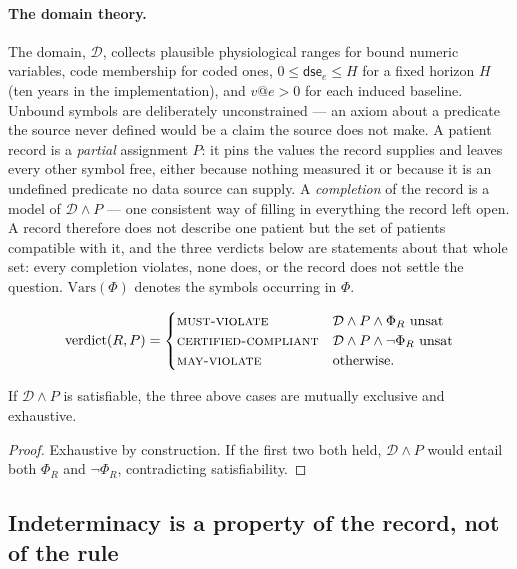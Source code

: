 \paragraph{The domain theory.}
The domain, $\mathcal{D}$, collects plausible physiological ranges for bound
numeric variables, code membership for coded ones, $0 \le \mathsf{dse}_e \le H$
for a fixed horizon $H$ (ten years in the implementation), and $v@e > 0$ for
each induced baseline. Unbound symbols are deliberately unconstrained --- an
axiom about a predicate the source never defined would be a claim the source
does not make. A patient record is a \emph{partial} assignment $P$: it pins the values the
record supplies and leaves every other symbol free, either because nothing
measured it or because it is an undefined predicate no data source can supply.
A \emph{completion} of the record is a model of $\mathcal{D} \wedge P$ --- one
consistent way of filling in everything the record left open. A record therefore
does not describe one patient but the set of patients compatible with it, and
the three verdicts below are statements about that whole set: every completion
violates, none does, or the record does not settle the question.
$\mathrm{Vars}(\Phi)$ denotes the symbols occurring in $\Phi$.

\[
\mathrm{verdict}(R,P) =
\begin{cases}
  \textsc{must-violate}       & \mathcal{D} \wedge P \wedge \Phi_R \ \text{unsat} \\
  \textsc{certified-compliant}& \mathcal{D} \wedge P \wedge \neg\Phi_R \ \text{unsat} \\
  \textsc{may-violate}        & \text{otherwise.}
\end{cases}
\]

\begin{proposition}
\label{prop:exhaustive}
If $\mathcal{D} \wedge P$ is satisfiable, the three above cases are mutually exclusive
and exhaustive.
\end{proposition}
\begin{proof}
Exhaustive by construction. If the first two both held, $\mathcal{D} \wedge P$
would entail both $\Phi_R$ and $\neg\Phi_R$, contradicting satisfiability.
\end{proof}

\subsection{Indeterminacy is a property of the record, not of the rule}

